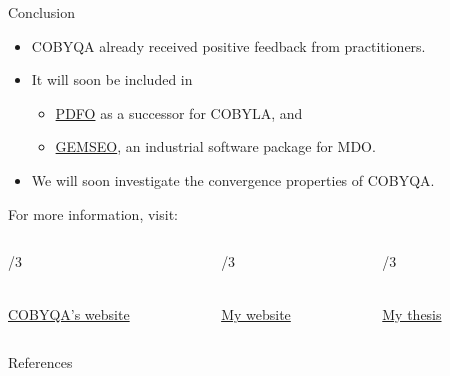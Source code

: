 \documentclass[
]{presentation}
\begin{document}
\begin{frame}{Conclusion}

    \begin{itemize}
        \item COBYQA already received \alert{positive} feedback from practitioners.
        \item It will soon be included in
        \begin{itemize}
            \item \href{https://www.pdfo.net/}{PDFO} as a successor for COBYLA, and
            \item \href{https://gemseo.readthedocs.io/}{GEMSEO}, an \alert{industrial} software package for MDO.
        \end{itemize}
        \item We will soon investigate the convergence properties of COBYQA.
    \end{itemize}

    For more information, visit:

    \medskip

    \begin{columns}
        \begin{column}{\textwidth/3}
            \begin{center}
                \\[1ex]
                \href{https://www.cobyqa.com/}{COBYQA's website}
            \end{center}
        \end{column}
        \begin{column}{\textwidth/3}
            \begin{center}
                \\[1ex]
                \href{https://www.tomragonneau.com/}{My website}
            \end{center}
        \end{column}
        \begin{column}{\textwidth/3}
            \begin{center}
                \\[1ex]
                \href{https://tomragonneau.com/documents/thesis.pdf}{My thesis}
            \end{center}
        \end{column}
    \end{columns}
\end{frame}

\appendix

\begin{frame}[t,allowframebreaks]{References}
    \printbibliography[heading=none]
\end{frame}
\end{document}
